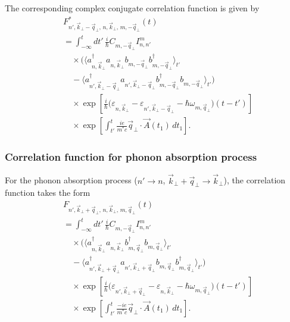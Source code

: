 \documentclass[%
 reprint,
 amsmath,amssymb,
 aps,
]{revtex4-2}
\begin{document}
The corresponding complex conjugate correlation function is given by
\begin{equation}
\begin{aligned}
&F_{n',\vec{k}_{\perp}-\vec{q}_{\perp},\,n,\vec{k}_{\perp},\,m,-\vec{q}_{\perp}}^{*}(t)\\
&=
\int_{-\infty}^{t}
dt'\,
\frac{i}{\hbar}
C_{m,-\vec{q}_{\perp}}
I_{n,n'}^{m}
\\
&\quad\times
\Big(
\langle
a_{n,\vec{k}_{\perp}}^{\dagger}
a_{n,\vec{k}_{\perp}}
b_{m,-\vec{q}_{\perp}}
b_{m,-\vec{q}_{\perp}}^{\dagger}
\rangle_{t'}
\\
&\quad
-
\langle
a_{n',\vec{k}_{\perp}-\vec{q}_{\perp}}^{\dagger}
a_{n',\vec{k}_{\perp}-\vec{q}_{\perp}}
b_{m,-\vec{q}_{\perp}}^{\dagger}
b_{m,-\vec{q}_{\perp}}
\rangle_{t'}
\Big)
\\
&\quad\times
\exp\left[
\frac{i}{\hbar}
\big(
\varepsilon_{n,\vec{k}_{\perp}}
-
\varepsilon_{n',\vec{k}_{\perp}-\vec{q}_{\perp}}
-
\hbar\omega_{m,\vec{q}_{\perp}}
\big)
(t-t')
\right]
\\
&\quad\times
\exp\left[
\int_{t'}^{t}
\frac{ie}{m^{*}c}
\vec{q}_{\perp}
\cdot
\vec{A}(t_{1})
\, dt_{1}
\right].
\end{aligned}
\end{equation}


\subsubsection{Correlation function for phonon absorption process}

For the phonon absorption process
($n' \to n$, $\vec{k}_{\perp}+\vec{q}_{\perp}\to\vec{k}_{\perp}$),
the correlation function takes the form
\begin{equation}
\begin{aligned}
&F_{n',\vec{k}_{\perp}+\vec{q}_{\perp},\,n,\vec{k}_{\perp},\,m,\vec{q}_{\perp}}(t)\\
&=
\int_{-\infty}^{t}
dt'\,
\frac{i}{\hbar}
C_{m,-\vec{q}_{\perp}}
I_{n,n'}^{m}
\\
&\quad\times
\Big(
\langle
a_{n,\vec{k}_{\perp}}^{\dagger}
a_{n,\vec{k}_{\perp}}
b_{m,\vec{q}_{\perp}}^{\dagger}
b_{m,\vec{q}_{\perp}}
\rangle_{t'}
\\
&\quad
-
\langle
a_{n',\vec{k}_{\perp}+\vec{q}_{\perp}}^{\dagger}
a_{n',\vec{k}_{\perp}+\vec{q}_{\perp}}
b_{m,\vec{q}_{\perp}}
b_{m,\vec{q}_{\perp}}^{\dagger}
\rangle_{t'}
\Big)
\\
&\quad\times
\exp\left[
\frac{i}{\hbar}
\big(
\varepsilon_{n',\vec{k}_{\perp}+\vec{q}_{\perp}}
-
\varepsilon_{n,\vec{k}_{\perp}}
-
\hbar\omega_{m,\vec{q}_{\perp}}
\big)
(t-t')
\right]
\\
&\quad\times
\exp\left[
\int_{t'}^{t}
\frac{-ie}{m^{*}c}
\vec{q}_{\perp}
\cdot
\vec{A}(t_{1})
\, dt_{1}
\right].
\end{aligned}
\end{equation}
\end{document}
